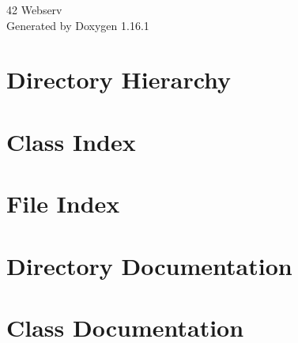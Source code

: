\documentclass[twoside]{book}
\newcommand{\+}{\discretionary{\mbox{\scriptsize$\hookleftarrow$}}{}{}}
\newcommand{\clearemptydoublepage}{%
    \newpage{\pagestyle{empty}\cleardoublepage}%
  }
\begin{document}
  \raggedbottom
    \hypersetup{pageanchor=false,
                bookmarksnumbered=true,
                pdfencoding=unicode
               }
  \begin{titlepage}
  \vspace*{7cm}
  \begin{center}%
  {\Large 42 Webserv}\\
  \vspace*{1cm}
  {\large Generated by Doxygen 1.16.1}\\
  \end{center}
  \end{titlepage}
  \clearemptydoublepage
  \tableofcontents
  \clearemptydoublepage
  \hypersetup{pageanchor=true}


\chapter{Directory Hierarchy}

\chapter{Class Index}

\chapter{File Index}

\chapter{Directory Documentation}

\chapter{Class Documentation}












\end{document}
